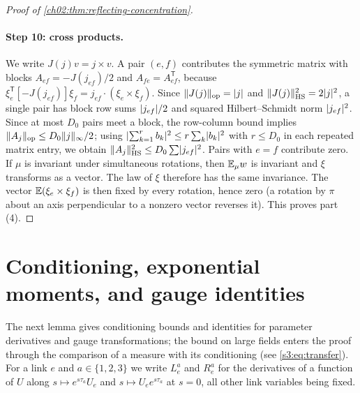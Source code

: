 \begin{proof}[Proof of \cref{ch02:thm:reflecting-concentration}]
\paragraph{Step 10: cross products.} We write $J(j)v=j\times v$. A pair $(e,f)$ contributes the symmetric matrix with blocks $A_{ef}=-J(j_{ef})/2$ and $A_{fe}=A_{ef}^{\mathsf T}$, because $\xi_e^{\mathsf T}[-J(j_{ef})]\xi_f=j_{ef}\cdot(\xi_e\times\xi_f)$. Since $\lVert J(j)\rVert_{\mathrm{op}}=\lvert j\rvert$ and $\lVert J(j)\rVert_{\mathrm{HS}}^2=2\lvert j\rvert^2$, a single pair has block row sums $\lvert j_{ef}\rvert/2$ and squared Hilbert--Schmidt norm $\lvert j_{ef}\rvert^2$. Since at most $D_0$ pairs meet a block, the row-column bound implies $\lVert A_j\rVert_{\mathrm{op}}\le D_0\lVert j\rVert_\infty/2$; using $\lvert \sum_{k=1}^rb_k\rvert^2\le r\sum_k\lvert b_k\rvert^2$ with $r\le D_0$ in each repeated matrix entry, we obtain $\lVert A_j\rVert_{\mathrm{HS}}^2\le D_0\sum\lvert j_{ef}\rvert^2$. Pairs with $e=f$ contribute zero. If $\mu$ is invariant under simultaneous rotations, then $\mathbb E_\mu w$ is invariant and $\xi$ transforms as a vector. The law of $\xi$ therefore has the same invariance. The vector $\mathbb E(\xi_e\times\xi_f)$ is then fixed by every rotation, hence zero (a rotation by $\pi$ about an axis perpendicular to a nonzero vector reverses it). This proves part (4).
\end{proof}

\section{Conditioning, exponential moments, and gauge identities}\label{ch02:sec:conditioning}

The next lemma gives conditioning bounds and identities for parameter derivatives and gauge transformations; the bound on large fields enters the proof through the comparison of a measure with its conditioning (see \eqref{s3:eq:transfer}). For a link $e$ and $a\in\{1,2,3\}$ we write $L_e^a$ and $R_e^a$ for the derivatives of a function of $U$ along $s\mapsto e^{s\tau_a}U_e$ and $s\mapsto U_ee^{s\tau_a}$ at $s=0$, all other link variables being fixed.

